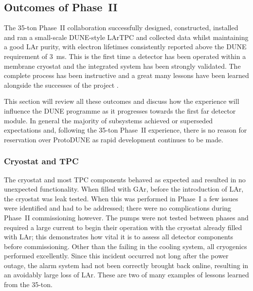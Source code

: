 \subsection{Outcomes of Phase~II}\label{sec:35tonPhaseIIOutcomes}

The 35-ton Phase~II collaboration successfully designed, constructed, installed and ran a small-scale DUNE-style LArTPC and collected data whilst maintaining a good LAr purity, with electron lifetimes consistently reported above the DUNE requirement of 3~ms.  This is the first time a detector has been operated within a membrane cryostat and the integrated system has been strongly validated.  The complete process has been instructive and a great many lessons have been learned alongside the successes of the project \cite{35tonLessonsLearned}.

This section will review all these outcomes and discuss how the experience will influence the DUNE programme as it progresses towards the first far detector module.  In general the majority of subsystems achieved or superseded expectations and, following the 35-ton Phase~II experience, there is no reason for reservation over ProtoDUNE as rapid development continues to be made.

\subsubsection{Cryostat and TPC}\label{sec:35tonPhaseIIOutcomesCryostatTPC}

The cryostat and most TPC components behaved as expected and resulted in no unexpected functionality.  When filled with GAr, before the introduction of LAr, the cryostat was leak tested.  When this was performed in Phase~I a few issues were identified and had to be addressed; there were no complications during Phase~II commissioning however.  The pumps were not tested between phases and required a large current to begin their operation with the cryostat already filled with LAr; this demonstrates how vital it is to assess all detector components before commissioning.  Other than the failing in the cooling system, all cryogenics performed excellently.  Since this incident occurred not long after the power outage, the alarm system had not been correctly brought back online, resulting in an avoidably large loss of LAr.  These are two of many examples of lessons learned from the 35-ton.

